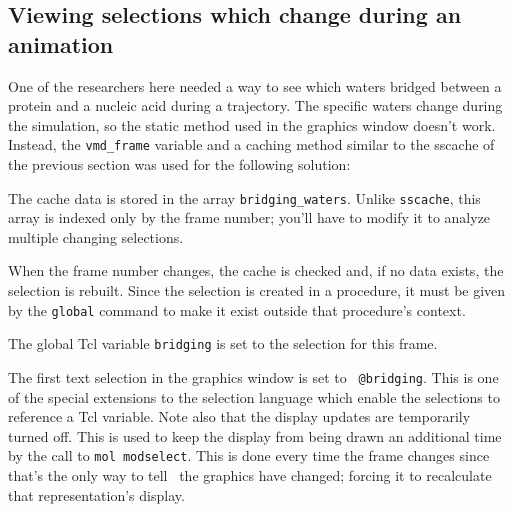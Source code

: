 \subsection{Viewing selections which change during an animation}
\label{ug:topic:scripts:anim}

One of the researchers here needed a way to see which waters bridged
between a protein and a nucleic acid during a trajectory.  The
specific waters change during the simulation, so the static method
used in the graphics window doesn't work.  Instead, the {\tt vmd\_frame}
variable and a caching method similar to the sscache of the previous
section was used for the following solution:

The cache data is stored in the array {\tt bridging\_waters}.  Unlike
{\tt sscache}, this array is indexed only by the frame number; you'll
have to modify it to analyze multiple changing selections.

When the frame number changes, the cache is checked and, if no data
exists, the selection is rebuilt.  Since the selection is created in a
procedure, it must be given by the {\tt global} command to make it exist
outside that procedure's context.

The global Tcl variable {\tt bridging} is set to the selection for
this frame.

The first text selection in the graphics window is set to {\tt
@bridging}.  This is one of the special extensions to the selection
language which enable the selections to reference a Tcl variable.
Note also that the display updates are temporarily turned off.  This
is used to keep the display from being drawn an additional time by the
call to {\tt mol modselect}.  This is done every time the frame
changes since that's the only way to tell \VMD\ the graphics have
changed; forcing it to recalculate that representation's display.

